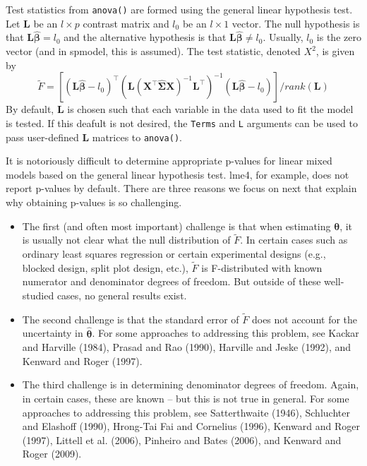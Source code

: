 \documentclass{article}
\providecommand{\tightlist}{%
  \setlength{\itemsep}{0pt}\setlength{\parskip}{0pt}}
\begin{document}
Test statistics from \texttt{anova()} are formed using the general
linear hypothesis test. Let \(\mathbf{L}\) be an \(l \times p\) contrast
matrix and \(l_0\) be an \(l \times 1\) vector. The null hypothesis is
that \(\mathbf{L} \bm{\hat{\beta}} = l_0\) and the alternative
hypothesis is that \(\mathbf{L} \bm{\hat{\beta}} \neq l_0\). Usually,
\(l_0\) is the zero vector (and in spmodel, this is assumed). The test
statistic, denoted \(X^2\), is given by \begin{equation}\label{eq:glht}
  \tilde{F} = [(\mathbf{L} \bm{\hat{\beta}} - l_0)^\intercal(\mathbf{L} (\mathbf{X}^\intercal \mathbf{\hat{\Sigma}} \mathbf{X})^{-1} \mathbf{L}^\intercal)^{-1}(\mathbf{L} \bm{\hat{\beta}} - l_0)]/ rank(\mathbf{L})
\end{equation} By default, \(\mathbf{L}\) is chosen such that each
variable in the data used to fit the model is tested. If this deafult is
not desired, the \texttt{Terms} and \texttt{L} arguments can be used to
pass user-defined \(\mathbf{L}\) matrices to \texttt{anova()}.

It is notoriously difficult to determine appropriate p-values for linear
mixed models based on the general linear hypothesis test. lme4, for
example, does not report p-values by default. There are three reasons we
focus on next that explain why obtaining p-values is so challenging.

\begin{itemize}
\tightlist
\item
  The first (and often most important) challenge is that when estimating
  \(\bm{\theta}\), it is usually not clear what the null distribution of
  \(\tilde{F}\). In certain cases such as ordinary least squares
  regression or certain experimental designs (e.g., blocked design,
  split plot design, etc.), \(\tilde{F}\) is F-distributed with known
  numerator and denominator degrees of freedom. But outside of these
  well-studied cases, no general results exist.
\item
  The second challenge is that the standard error of \(\tilde{F}\) does
  not account for the uncertainty in \(\bm{\hat{\theta}}\). For some
  approaches to addressing this problem, see Kackar and Harville (1984),
  Prasad and Rao (1990), Harville and Jeske (1992), and Kenward and
  Roger (1997).
\item
  The third challenge is in determining denominator degrees of freedom.
  Again, in certain cases, these are known -- but this is not true in
  general. For some approaches to addressing this problem, see
  Satterthwaite (1946), Schluchter and Elashoff (1990), Hrong-Tai Fai
  and Cornelius (1996), Kenward and Roger (1997), Littell et al. (2006),
  Pinheiro and Bates (2006), and Kenward and Roger (2009).
\end{itemize}
\end{document}
